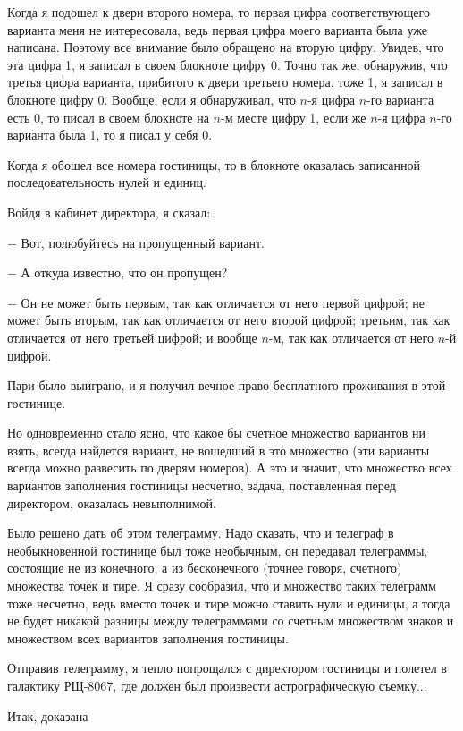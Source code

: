 \documentclass{article}
\begin{document}
Когда я подошел к двери второго номера, то первая цифра соответствующего варианта меня не интересовала, ведь первая цифра моего варианта была уже написана. Поэтому все внимание было обращено на вторую цифру. Увидев, что эта цифра 1, я записал в своем блокноте цифру 0. Точно так же, обнаружив, что третья цифра варианта, прибитого к двери третьего номера, тоже 1, я записал в блокноте цифру 0. Вообще, если я обнаруживал, что \(n\)-я цифра \(n\)-го варианта есть 0, то писал в своем блокноте на \(n\)-м месте цифру 1, если же \(n\)-я цифра \(n\)-го варианта была 1, то я писал у себя 0.

Когда я обошел все номера гостиницы, то в блокноте оказалась записанной последовательность нулей и единиц.

Войдя в кабинет директора, я сказал:

\(-\) Вот, полюбуйтесь на пропущенный вариант.

\(-\) А откуда известно, что он пропущен?

\(-\) Он не может быть первым, так как отличается от него первой цифрой; не может быть вторым, так как отличается от него второй цифрой; третьим, так как отличается от него третьей цифрой; и вообще \(n\)-м, так как отличается от него \(n\)-й цифрой.

Пари было выиграно, и я получил вечное право бесплатного проживания в этой гостинице.

Но одновременно стало ясно, что какое бы счетное множество вариантов ни взять, всегда найдется вариант, не вошедший в это множество (эти варианты всегда можно развесить по дверям номеров). А это и значит, что множество всех вариантов заполнения гостиницы несчетно, задача, поставленная перед директором, оказалась невыполнимой.

Было решено дать об этом телеграмму. Надо сказать, что и телеграф в необыкновенной гостинице был тоже необычным, он передавал телеграммы, состоящие не из конечного, а из бесконечного (точнее говоря, счетного) множества точек и тире. Я сразу сообразил, что и множество таких телеграмм тоже несчетно, ведь вместо точек и тире можно ставить нули и единицы, а тогда не будет никакой разницы между телеграммами со счетным множеством знаков и множеством всех вариантов заполнения гостиницы.

Отправив телеграмму, я тепло попрощался с директором гостиницы и полетел в галактику РЩ-8067, где должен был произвести астрографическую съемку... \newline

Итак, доказана
\end{document}
